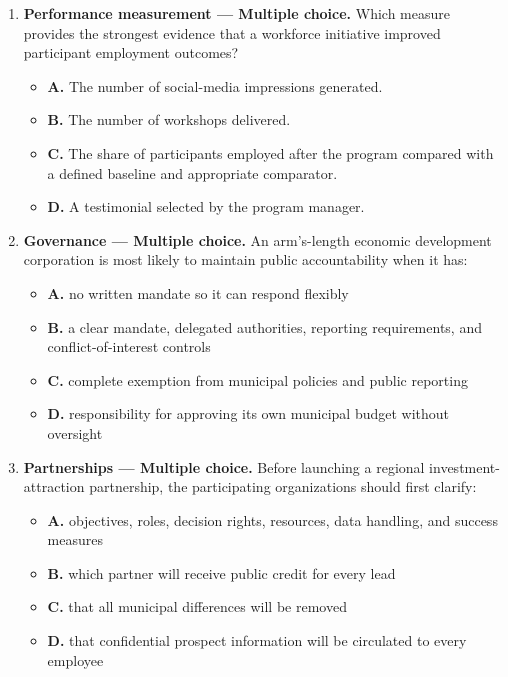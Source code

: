 \documentclass[11pt,letterpaper,oneside,openany]{book}
\begin{document}
\begin{enumerate}[leftmargin=*,itemsep=1.1em]
\begin{itemize}[leftmargin=1.7em]
\item \textbf{D.} a long-term outcome
\end{itemize}
\item \textbf{Performance measurement --- Multiple choice.} Which measure provides the strongest evidence that a workforce initiative improved participant employment outcomes?
\begin{itemize}[leftmargin=1.7em]
\item \textbf{A.} The number of social-media impressions generated.
\item \textbf{B.} The number of workshops delivered.
\item \textbf{C.} The share of participants employed after the program compared with a defined baseline and appropriate comparator.
\item \textbf{D.} A testimonial selected by the program manager.
\end{itemize}
\item \textbf{Governance --- Multiple choice.} An arm's-length economic development corporation is most likely to maintain public accountability when it has:
\begin{itemize}[leftmargin=1.7em]
\item \textbf{A.} no written mandate so it can respond flexibly
\item \textbf{B.} a clear mandate, delegated authorities, reporting requirements, and conflict-of-interest controls
\item \textbf{C.} complete exemption from municipal policies and public reporting
\item \textbf{D.} responsibility for approving its own municipal budget without oversight
\end{itemize}
\item \textbf{Partnerships --- Multiple choice.} Before launching a regional investment-attraction partnership, the participating organizations should first clarify:
\begin{itemize}[leftmargin=1.7em]
\item \textbf{A.} objectives, roles, decision rights, resources, data handling, and success measures
\item \textbf{B.} which partner will receive public credit for every lead
\item \textbf{C.} that all municipal differences will be removed
\item \textbf{D.} that confidential prospect information will be circulated to every employee

\end{itemize}
\end{enumerate}
\end{document}
